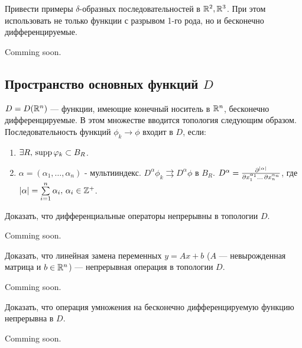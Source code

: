 \begin{task}
	Привести примеры $\delta$-образных последовательностей в $\mathbb{R}^2, \mathbb{R}^3$. При этом использовать не только функции с разрывом 1-го рода, но и бесконечно дифференцируемые.
\end{task}

\begin{solution}
	Comming soon.
\end{solution}


\subsection{Пространство основных функций $D$}


$D = D(\mathbb{R}^n)$ --- функции, имеющие конечный носитель в $\mathbb{R}^n$, бесконечно дифференцируемые. В этом множестве вводится топология следующим образом. Последовательность функций $\phi_k \to \phi$ входит в $D$, если:
\begin{enumerate}
	\item $\exists R, \, \operatorname{supp} \varphi_k \subset B_R$.
	\item $\alpha = (\alpha_1, \dots, \alpha_n)$ - мультииндекс. $D^{\alpha}\phi_k \rightrightarrows D^{\alpha}\phi$ в $B_R$. $D^{\alpha} = \frac{ \partial^{\left| \alpha \right|} }{\partial x_1^{\alpha_1} \dots \, \partial x_n^{\alpha_n}}$, где $\left| \alpha \right| = \sum\limits_{i=1}^n \alpha_i, \,\alpha_i \in \mathbb{Z}^+$.
\end{enumerate}


\begin{task}
	Доказать, что дифференциальные операторы непрерывны в топологии $D$.
\end{task}


\begin{solution}

	Comming soon.
\end{solution}


\begin{task}
	Доказать, что линейная замена переменных $y = Ax+b$ ($A$ --- невырожденная матрица и $b \in \mathbb{R}^n$) --- непрерывная операция в топологии $D$.
\end{task}


\begin{solution}

	Comming soon.
\end{solution}


\begin{task}
	Доказать, что операция умножения на бесконечно дифференцируемую функцию непрерывна в $D$.
\end{task}


\begin{solution}

	Comming soon.
\end{solution}
